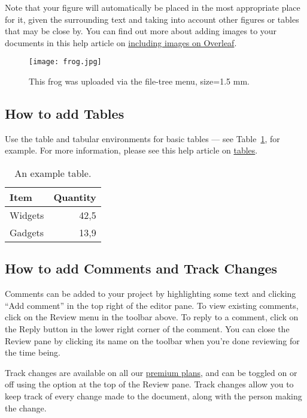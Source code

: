 \documentclass{article}
\begin{document}
Note that your figure will automatically be placed in the most appropriate place for it, given the surrounding text and taking into account other figures or tables that may be close by. You can find out more about adding images to your documents in this help article on \href{https://www.overleaf.com/learn/how-to/Including_images_on_Overleaf}{including images on Overleaf}. 

\begin{figure} 
\centering 
\texttt{[image: frog.jpg]} 
\caption{\label{fig:frog}This frog was uploaded via the file-tree menu, size=1.5 mm.} 
\end{figure} 

\subsection{How to add Tables} 

Use the table and tabular environments for basic tables --- see Table~\ref{tab:widgets}, for example. For more information, please see this help article on \href{https://www.overleaf.com/learn/latex/tables}{tables}. 

\begin{table} 
\centering 
\begin{tabular}{l|r} 
Item & Quantity \\\hline 
Widgets & 42,5 \\ 
Gadgets & 13,9 
\end{tabular} 
\caption{\label{tab:widgets}An example table.} 
\end{table} 

\subsection{How to add Comments and Track Changes} 

Comments can be added to your project by highlighting some text and clicking ``Add comment'' in the top right of the editor pane. To view existing comments, click on the Review menu in the toolbar above. To reply to a comment, click on the Reply button in the lower right corner of the comment. You can close the Review pane by clicking its name on the toolbar when you're done reviewing for the time being. 

Track changes are available on all our \href{https://www.overleaf.com/user/subscription/plans}{premium plans}, and can be toggled on or off using the option at the top of the Review pane. Track changes allow you to keep track of every change made to the document, along with the person making the change. 
\end{document}

